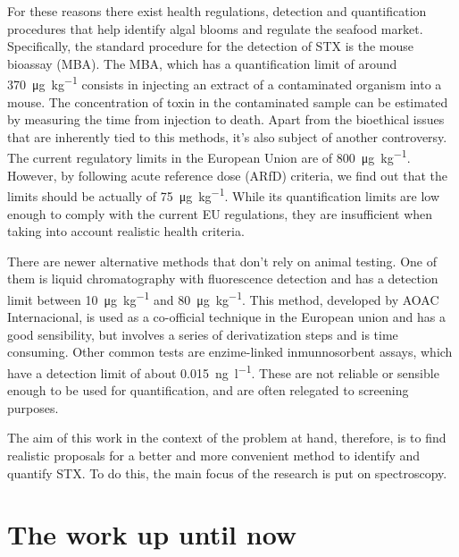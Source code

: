 For these reasons there exist health regulations, detection and quantification procedures that help identify algal blooms and regulate the seafood market.
Specifically, the standard procedure for the detection of STX is the mouse bioassay (MBA).
The MBA, which has a quantification limit of around \SI{370}{\micro\gram\per\kilo\gram} consists in injecting an extract of a contaminated organism into a mouse.
The concentration of toxin in the contaminated sample can be estimated by measuring the time from injection to death.\cite{who84}
Apart from the bioethical issues that are inherently tied to this methods, it's also subject of another controversy.
The current regulatory limits in the European Union are of \SI{800}{\micro\gram\per\kilo\gram}.
However, by following acute reference dose (ARfD) criteria, we find out that the limits should be actually of \SI{75}{\micro\gram\per\kilo\gram}.\cite{efsa09}
While its quantification limits are low enough to comply with the current EU regulations, they are insufficient when taking into account realistic health criteria.

There are newer alternative methods that don't rely on animal testing.
One of them is liquid chromatography with fluorescence detection and has a detection limit between \SI{10}{\micro\gram\per\kilo\gram} and \SI{80}{\micro\gram\per\kilo\gram}.\cite{eu17,aoac16}
This method, developed by AOAC Internacional, is used as a co-official technique in the European union and has a good sensibility, but involves a series of derivatization steps and is time consuming.
Other common tests are enzime-linked inmunnosorbent assays, which have a detection limit of about \SI{0.015}{\nano\gram\per\litre}.\cite{wharton17}
These are not reliable or sensible enough to be used for quantification, and are often relegated to screening purposes.

The aim of this work in the context of the problem at hand, therefore, is to find realistic proposals for a better and more convenient method to identify and quantify STX.
To do this, the main focus of the research is put on spectroscopy.

\section{The work up until now}

